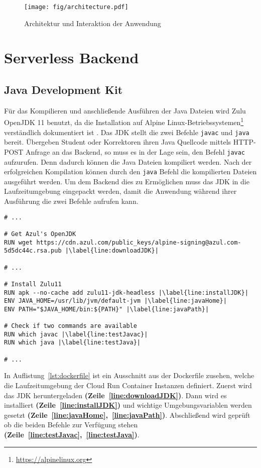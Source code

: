 \begin{figure}
  \centering
  \texttt{[image: fig/architecture.pdf]}
  \caption{Architektur und Interaktion der Anwendung}
  \label{fig:architecture}
\end{figure}

\section{Serverless Backend}
\subsection{Java Development Kit}
Für das Kompilieren und anschließende Ausführen der Java Dateien wird
Zulu OpenJDK 11 benutzt, da die Installation auf
Alpine Linux-Betriebssystemen\footnote{\url{https://alpinelinux.org}}
verständlich dokumentiert ist \cite{AzulZuluJDK}.
Das JDK stellt die zwei Befehle \texttt{javac} und \texttt{java} bereit.
Übergeben Student oder Korrektoren ihren Java Quellcode mittels HTTP-POST Anfrage an
das Backend, so muss es in der Lage sein, den Befehl \texttt{javac}
aufzurufen. Denn dadurch können die Java Dateien kompiliert werden.
Nach der erfolgreichen Kompilation können durch den \texttt{java} Befehl die kompilierten Dateien
ausgeführt werden. Um dem Backend dies zu Ermöglichen muss das JDK in die Laufzeitumgebung eingepackt
werden, damit die Anwendung während ihrer Ausführung die zwei Befehle aufrufen kann.\\

\begin{lstlisting}[caption={Ausschnitt aus der Dockerfile. Herunterladen und Einrichten des JDK.}, label={lst:dockerfile}, escapechar=|]
# ... 

# Get Azul's OpenJDK
RUN wget https://cdn.azul.com/public_keys/alpine-signing@azul.com-5d5dc44c.rsa.pub |\label{line:downloadJDK}|

# ...

# Install Zulu11
RUN apk --no-cache add zulu11-jdk-headless |\label{line:installJDK}|
ENV JAVA_HOME=/usr/lib/jvm/default-jvm |\label{line:javaHome}|
ENV PATH="$JAVA_HOME/bin:${PATH}" |\label{line:javaPath}|

# Check if two commands are available
RUN which javac |\label{line:testJavac}|
RUN which java |\label{line:testJava}|

# ...
\end{lstlisting}

In Auflistung~\ref{lst:dockerfile} ist ein Ausschnitt
aus der Dockerfile zusehen, welche die Laufzeitumgebung
der Cloud Run Container Instanzen definiert. Zuerst wird das JDK
heruntergeladen \textbf{(Zeile~\ref{line:downloadJDK})}. Dann wird es
installiert \textbf{(Zeile~\ref{line:installJDK})} und wichtige Umgebungsvariablen
werden gesetzt \textbf{(Zeile~\ref{line:javaHome},~\ref{line:javaPath})}.
Abschließend wird geprüft ob die beiden Befehle
zur Verfügung stehen \textbf{(Zeile~\ref{line:testJavac},~\ref{line:testJava})}.

